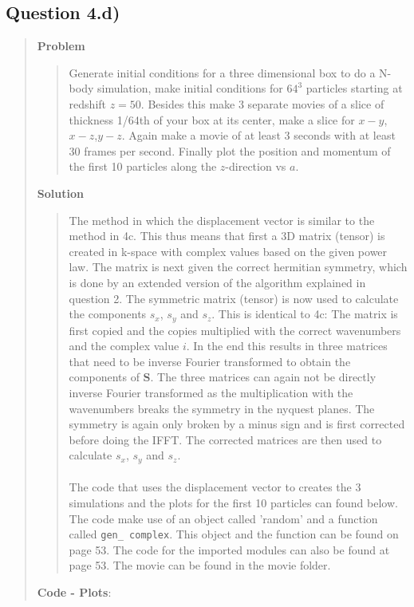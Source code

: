 
\subsection*{\textbf{Question 4.d)}}
\begin{quote}

\textbf{Problem}
\begin{quote} 
Generate initial conditions for a three dimensional box to do a N-body simulation, make initial conditions for $64^3$ particles starting at redshift $z = 50$. Besides this make 3 separate movies of a slice of thickness 1/64th of your box at its center, make a slice for $x-y$, $x-z$,$y-z$. Again make a movie of at least 3 seconds with at least 30 frames per second. Finally plot the position and momentum of the first 10 particles along the $z$-direction vs $a$.
\end{quote}

\textbf{Solution} 
\begin{quote}
The method in which the displacement vector is similar to the method in 4c. This thus means that first a 3D matrix (tensor) is created in k-space with complex values based on the given power law. The matrix is next given the correct hermitian symmetry, which is done by an extended version of the algorithm explained in question 2. The symmetric matrix (tensor) is now used to calculate the components $s_x$, $s_y$ and $s_z$. This is identical to 4c: The matrix is first copied and the copies multiplied with the correct wavenumbers and the complex value $i$. In the end this results in three matrices that need to be inverse Fourier transformed to obtain the components of $\textbf{S}$. The three matrices can again not be directly inverse Fourier transformed as the multiplication with the wavenumbers breaks the symmetry in the nyquest planes. The symmetry is again only broken by a minus sign and is first corrected before doing the IFFT. The corrected matrices are then used to calculate $s_x$, $s_y$ and $s_z$. 
\\
\\
The code that uses the displacement vector to creates the 3 simulations and the plots for the first 10 particles can found below. The code make use of an object called 'random' and a function called \texttt{gen\_ complex}. This object and the function  can be found on page 53. The code for the imported modules can also be found at page 53. The movie can be found in the movie folder.
\newpage
\end{quote}

\textbf{Code - Plots}:
\begin{quote}


\end{quote}
\end{quote}
